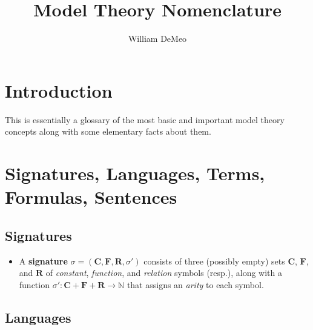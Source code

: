 \documentclass[a4paper,UKenglish,cleveref,autoref,thm-restate,12pt]{lipics-v2021-wjd}
\title{Model Theory Nomenclature}%
\author{William DeMeo}
       {Department of Algebra, Charles University in Prague \and \url{https://williamdemeo.gitlab.io}}
       {williamdemeo@gmail.com}{https://orcid.org/0000-0003-1832-5690}{}
\newcommand{\<}{\langle}
\renewcommand{\>}{\rangle}
\begin{document}
\maketitle

\section{Introduction}\label{sec:introduction}

This is essentially a glossary of the most basic and important model
theory concepts along with some elementary facts about them.


\section{Signatures, Languages, Terms, Formulas, Sentences}\label{signatures-languages-terms-formulas-sentences}

\subsection{Signatures}\label{signatures}

\begin{itemize}
\item
  A \textbf{signature}
  \(\sigma = (\mathbf{C}, \mathbf{F}, \mathbf{R}, \sigma')\) consists of
  three (possibly empty) sets \(\mathbf{C}\), \(\mathbf{F}\), and
  \(\mathbf{R}\) of \emph{constant}, \emph{function}, and
  \emph{relation} symbols (resp.), along with a function
  \(\sigma': \mathbf{C} + \mathbf {F} + \mathbf{R} \to \mathbb N\) that
  assigns an \emph{arity} to each symbol.
\end{itemize}


\subsection{Languages}\label{languages}
\end{document}

